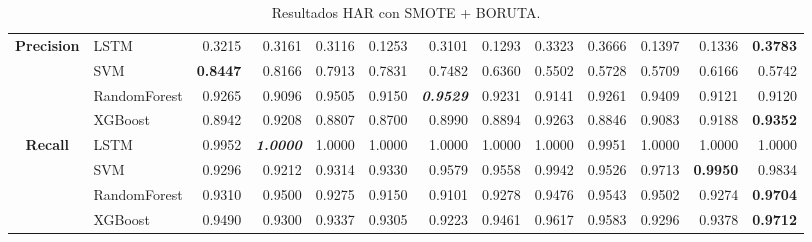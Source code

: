 \begin{table}[H]
\begin{adjustbox}{max width=14cm}
\begin{tabular}{|c|l|r|r|r|r|r|r|r|r|r|r|r|}
			\hline
			\textbf{Precision} &  LSTM &  0.3215 &  0.3161 &  0.3116 &  0.1253 &  0.3101 &  0.1293 &  0.3323 &  0.3666 &  0.1397 &  0.1336 & \textbf{  0.3783 } \\
			&  SVM & \textbf{  0.8447 } &  0.8166 &  0.7913 &  0.7831 &  0.7482 &  0.6360 &  0.5502 &  0.5728 &  0.5709 &  0.6166 &  0.5742 \\
			&  RandomForest &  0.9265 &  0.9096 &  0.9505 &  0.9150 & \textit{ \textbf{  0.9529 } } &  0.9231 &  0.9141 &  0.9261 &  0.9409 &  0.9121 &  0.9120 \\
			&  XGBoost &  0.8942 &  0.9208 &  0.8807 &  0.8700 &  0.8990 &  0.8894 &  0.9263 &  0.8846 &  0.9083 &  0.9188 & \textbf{  0.9352 } \\
			\hline
			\textbf{Recall} &  LSTM &  0.9952 & \textit{ \textbf{  1.0000 } } &  1.0000 &  1.0000 &  1.0000 &  1.0000 &  1.0000 &  0.9951 &  1.0000 &  1.0000 &  1.0000 \\
			&  SVM &  0.9296 &  0.9212 &  0.9314 &  0.9330 &  0.9579 &  0.9558 &  0.9942 &  0.9526 &  0.9713 & \textbf{  0.9950 } &  0.9834 \\
			&  RandomForest &  0.9310 &  0.9500 &  0.9275 &  0.9150 &  0.9101 &  0.9278 &  0.9476 &  0.9543 &  0.9502 &  0.9274 & \textbf{  0.9704 } \\
			&  XGBoost &  0.9490 &  0.9300 &  0.9337 &  0.9305 &  0.9223 &  0.9461 &  0.9617 &  0.9583 &  0.9296 &  0.9378 & \textbf{  0.9712 } \\
			\hline
		\end{tabular}
	\end{adjustbox}
	\caption{Resultados HAR con SMOTE + BORUTA.}
	\label{tab:HAR_SMOTE_BORUTA}
\end{table}

